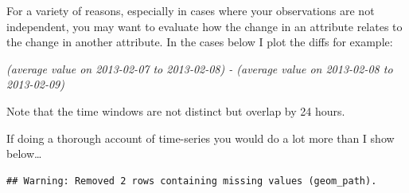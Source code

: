 \documentclass[]{book}
\newenvironment{Shaded}{\begin{snugshade}}{\end{snugshade}}
\newcommand{\DataTypeTok}[1]{\textcolor[rgb]{0.13,0.29,0.53}{#1}}
\newcommand{\DecValTok}[1]{\textcolor[rgb]{0.00,0.00,0.81}{#1}}
\newcommand{\KeywordTok}[1]{\textcolor[rgb]{0.13,0.29,0.53}{\textbf{#1}}}
\newcommand{\NormalTok}[1]{#1}
\newcommand{\OperatorTok}[1]{\textcolor[rgb]{0.81,0.36,0.00}{\textbf{#1}}}
\newcommand{\StringTok}[1]{\textcolor[rgb]{0.31,0.60,0.02}{#1}}
\theoremstyle{definition}
\theoremstyle{definition}
\theoremstyle{definition}
\theoremstyle{remark}
\begin{document}
For a variety of reasons, especially in cases where your observations
are not independent, you may want to evaluate how the change in an
attribute relates to the change in another attribute. In the cases below
I plot the diffs for example:

\emph{(average value on 2013-02-07 to 2013-02-08) - (average value on
2013-02-08 to 2013-02-09)}

Note that the time windows are not distinct but overlap by 24 hours.

If doing a thorough account of time-series you would do a lot more than
I show below\ldots{}

\begin{Shaded}
\end{Shaded}

\begin{verbatim}
## Warning: Removed 2 rows containing missing values (geom_path).
\end{verbatim}
\end{document}
